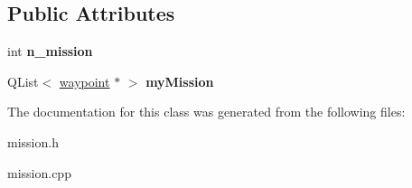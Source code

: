 \subsection*{Public Attributes}
\begin{DoxyCompactItemize}
\item 
\hypertarget{classmission_a832154972be2288e29b27573aa1cffc3}{int {\bfseries n\-\_\-mission}}\label{classmission_a832154972be2288e29b27573aa1cffc3}

\item 
\hypertarget{classmission_a0ec67add31f2a1a612fe49902c02604e}{Q\-List$<$ \hyperlink{classwaypoint}{waypoint} $\ast$ $>$ {\bfseries my\-Mission}}\label{classmission_a0ec67add31f2a1a612fe49902c02604e}

\end{DoxyCompactItemize}


The documentation for this class was generated from the following files\-:\begin{DoxyCompactItemize}
\item 
mission.\-h\item 
mission.\-cpp\end{DoxyCompactItemize}
